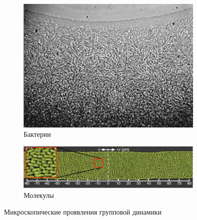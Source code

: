     \begin{figure}
    	\centering
        \begin{subfigure}[b]{0.3\textwidth}
        \centering
                \includegraphics[width=\textwidth]{Images/Fig11_CollectiveMotion}
                \caption{Бактерии~\cite[с. 85]{vicsek2012}}
                \label{fig:CollMot:bacteria}
        \end{subfigure}
        \begin{subfigure}[b]{0.6\textwidth}
        \centering
                \includegraphics[width=\textwidth]{Images/Fig15_CollectiveMotion_part}
                \caption{Молекулы~\cite[с. 87]{vicsek2012}}
                \label{fig:CollMot:moleculae}
        \end{subfigure}
        \caption{Микроскопические проявления групповой динамики}
        \label{fig:CollMot:microscpoic}
    \end{figure}
